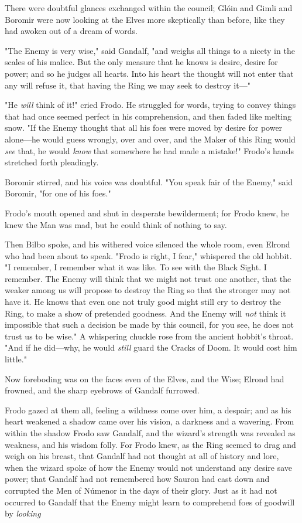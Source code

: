 There were doubtful glances exchanged within the council; Glóin and Gimli and
Boromir were now looking at the Elves more skeptically than before, like they
had awoken out of a dream of words.

"The Enemy is very wise," said Gandalf, "and weighs all things to a nicety in
the scales of his malice. But the only measure that he knows is desire, desire
for power; and so he judges all hearts. Into his heart the thought will not
enter that any will refuse it, that having the Ring we may seek to destroy
it\mbox{---}"

"He \emph{will} think of it!" cried Frodo. He struggled for words, trying to
convey things that had once seemed perfect in his comprehension, and then faded
like melting snow. "If the Enemy thought that all his foes were moved by desire
for power alone---he would guess wrongly, over and over, and the Maker of this
Ring would \emph{see} that, he would \emph{know} that somewhere he had made a
mistake!" Frodo's hands stretched forth pleadingly.

Boromir stirred, and his voice was doubtful. "You speak fair of the Enemy,"
said Boromir, "for one of his foes."

Frodo's mouth opened and shut in desperate bewilderment; for Frodo knew, he
knew the Man was mad, but he could think of nothing to say.

Then Bilbo spoke, and his withered voice silenced the whole room, even Elrond
who had been about to speak. "Frodo is right, I fear," whispered the old
hobbit. "I remember, I remember what it was like. To see with the Black Sight.
I remember. The Enemy will think that we might not trust one another, that the
weaker among us will propose to destroy the Ring so that the stronger may not
have it. He knows that even one not truly good might still cry to destroy the
Ring, to make a show of pretended goodness. And the Enemy will \emph{not} think
it impossible that such a decision be made by this council, for you see, he
does not trust us to be wise." A whispering chuckle rose from the ancient
hobbit's throat. "And if he did---why, he would \emph{still} guard the Cracks
of Doom. It would cost him little."

Now foreboding was on the faces even of the Elves, and the Wise; Elrond had
frowned, and the sharp eyebrows of Gandalf furrowed.

Frodo gazed at them all, feeling a wildness come over him, a despair; and as
his heart weakened a shadow came over his vision, a darkness and a wavering.
From within the shadow Frodo saw Gandalf, and the wizard's strength was
revealed as weakness, and his wisdom folly. For Frodo knew, as the Ring seemed
to drag and weigh on his breast, that Gandalf had not thought at all of history
and lore, when the wizard spoke of how the Enemy would not understand any
desire save power; that Gandalf had not remembered how Sauron had cast down and
corrupted the Men of Númenor in the days of their glory. Just as it had not
occurred to Gandalf that the Enemy might learn to comprehend foes of goodwill
by \emph{looking{\el}}

